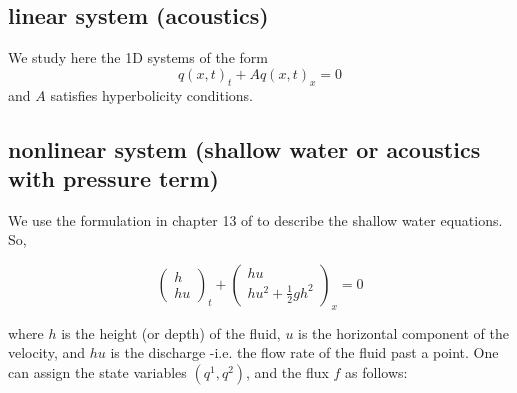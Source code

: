 \documentclass[12pt,leqno]{article}
\begin{document}
\subsection{linear system (acoustics)}
We study here the 1D systems of the form
\begin{equation}
q(x,t)_{t} + A q(x,t)_{x}=0
\end{equation}
\noindent and $A$ satisfies hyperbolicity conditions.

\subsection{nonlinear system (shallow water or acoustics with pressure term)}
We use the formulation in chapter 13 of \cite{levFVMHP} to describe the shallow water equations.
So, 

\begin{equation}
\left( \begin{array}{c}
h  \\
h u\end{array} \right)_{t} + 
\left( \begin{array}{c} 
hu \\
hu^2 + \frac{1}{2}gh^2\end{array} \right)_{x} = 0
\end{equation}

\noindent where $h$ is the height (or depth) of the fluid, $u$ is the horizontal component of the velocity, and $hu$ is the discharge -i.e. the flow rate of the fluid past a point. One can assign the state variables $(q^1,q^2)$, and the flux $f$ as follows: 
\end{document}
